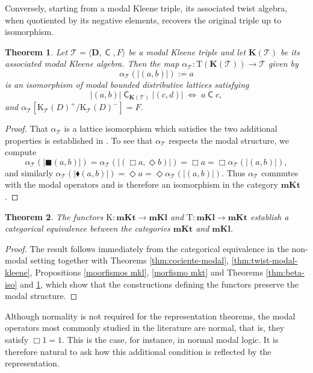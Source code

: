 \documentclass{article}
\newtheorem{theorem}{Theorem}[section]
\DeclareMathOperator{\con}{\mathsf{C}}
\newcommand{\KC}[1]{\mathrm{K}_\T(#1)}
\newcommand{\D}{\mathbf{D}}
\newcommand{\T}{\mathcal{T}}
\newcommand{\boxn}{\blacksquare}
\newcommand{\diamon}{\blacklozenge}
\begin{document}
Conversely, starting from a modal Kleene triple, its associated twist algebra, when quotiented by its negative elements, recovers the original triple up to isomorphism.

\begin{theorem}
\label{thm:alpha-iso}
    Let $\T=\langle\D, \con, F\rangle$ be a modal Kleene triple and let $\mathbf{K}(\T)$ be its associated modal Kleene algebra. Then the map $\alpha_\T \colon \mathrm{T}(\mathbf{K}(\T))\to \T$ given by
    \[
        \alpha_\T(|(a,b)|) := a
    \]
    is an isomorphism of modal bounded distributive lattices satisfying
    \[
        |(a,b)|\con_{\mathbf{K}(\T)} |(c,d)| \;\Longleftrightarrow\; a\con c,
    \]
    and $\alpha_\T[\KC{D}^+/\KC{D}^-]=F$.
\end{theorem}
\begin{proof}
    That $\alpha_\T$ is a lattice isomorphism which satisfies the two additional properties is established in \cite{jalali}.  To see that $\alpha_\T$ respects the modal structure, we compute
    \[
        \alpha_\T(|\boxn (a, b)|) = \alpha_\T(| (\Box a, \Diamond b)|) = \Box a = \Box \alpha_\T(|(a,b)|),
    \]
    and similarly $\alpha_\T(|\diamon (a,b)|) = \Diamond a = \Diamond \alpha_\T(|(a,b)|)$. Thus $\alpha_\T$ commutes with the modal operators and is therefore an isomorphism in the category $\mathbf{mKt}$.
\end{proof}

\begin{theorem}\label{teorema equivalencia}
The functors $\mathrm{K}:\mathbf{mKt}\to\mathbf{mKl}$ and $\mathrm{T}:\mathbf{mKl}\to\mathbf{mKt}$
establish a categorical equivalence between the categories $\mathbf{mKt}$ and $\mathbf{mKl}$.
\end{theorem}
\begin{proof}
The result follows immediately from the categorical equivalence in the non-modal setting together with Theorems \ref{thm:cociente-modal}, \ref{thm:twist-modal-kleene}, Propositions \ref{moorfismos mkl}, \ref{morfismo mkt} and Theorems \ref{thm:beta-iso} and \ref{thm:alpha-iso}, which show that the constructions defining the functors preserve the modal structure.
\end{proof}

Although normality is not required for the representation theorems, the modal operators most commonly studied in the literature are normal, that is, they satisfy $\Box 1=1$. This is the case, for instance, in normal modal logic. It is therefore natural to ask how this additional condition is reflected by the representation.
\end{document}
